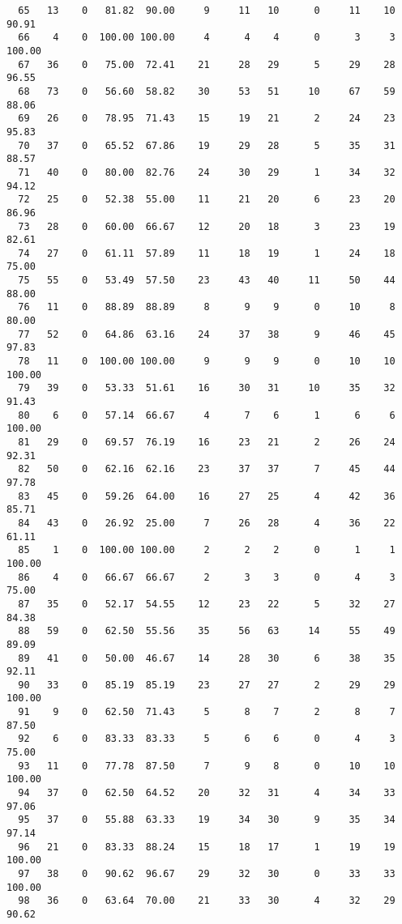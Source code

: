 \begin{verbatim}
  65   13    0   81.82  90.00     9     11   10      0     11    10    90.91
  66    4    0  100.00 100.00     4      4    4      0      3     3   100.00
  67   36    0   75.00  72.41    21     28   29      5     29    28    96.55
  68   73    0   56.60  58.82    30     53   51     10     67    59    88.06
  69   26    0   78.95  71.43    15     19   21      2     24    23    95.83
  70   37    0   65.52  67.86    19     29   28      5     35    31    88.57
  71   40    0   80.00  82.76    24     30   29      1     34    32    94.12
  72   25    0   52.38  55.00    11     21   20      6     23    20    86.96
  73   28    0   60.00  66.67    12     20   18      3     23    19    82.61
  74   27    0   61.11  57.89    11     18   19      1     24    18    75.00
  75   55    0   53.49  57.50    23     43   40     11     50    44    88.00
  76   11    0   88.89  88.89     8      9    9      0     10     8    80.00
  77   52    0   64.86  63.16    24     37   38      9     46    45    97.83
  78   11    0  100.00 100.00     9      9    9      0     10    10   100.00
  79   39    0   53.33  51.61    16     30   31     10     35    32    91.43
  80    6    0   57.14  66.67     4      7    6      1      6     6   100.00
  81   29    0   69.57  76.19    16     23   21      2     26    24    92.31
  82   50    0   62.16  62.16    23     37   37      7     45    44    97.78
  83   45    0   59.26  64.00    16     27   25      4     42    36    85.71
  84   43    0   26.92  25.00     7     26   28      4     36    22    61.11
  85    1    0  100.00 100.00     2      2    2      0      1     1   100.00
  86    4    0   66.67  66.67     2      3    3      0      4     3    75.00
  87   35    0   52.17  54.55    12     23   22      5     32    27    84.38
  88   59    0   62.50  55.56    35     56   63     14     55    49    89.09
  89   41    0   50.00  46.67    14     28   30      6     38    35    92.11
  90   33    0   85.19  85.19    23     27   27      2     29    29   100.00
  91    9    0   62.50  71.43     5      8    7      2      8     7    87.50
  92    6    0   83.33  83.33     5      6    6      0      4     3    75.00
  93   11    0   77.78  87.50     7      9    8      0     10    10   100.00
  94   37    0   62.50  64.52    20     32   31      4     34    33    97.06
  95   37    0   55.88  63.33    19     34   30      9     35    34    97.14
  96   21    0   83.33  88.24    15     18   17      1     19    19   100.00
  97   38    0   90.62  96.67    29     32   30      0     33    33   100.00
  98   36    0   63.64  70.00    21     33   30      4     32    29    90.62

\end{verbatim}
